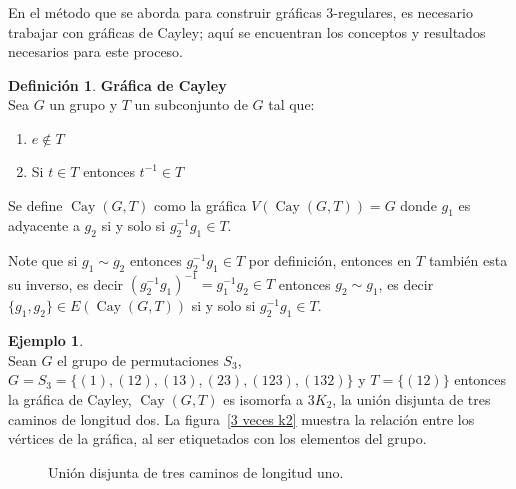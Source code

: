 \documentclass[11pt]{book}
\theoremstyle{definition}
\newtheorem{definition}{Definición}
\newtheorem{example}{Ejemplo}
\DeclareMathOperator{\Cay}{Cay}
\begin{document}
En el método que se aborda para construir gráficas 3-regulares, es
necesario trabajar con gráficas de Cayley; aquí se encuentran los
conceptos y resultados necesarios para este proceso.


\begin{definition}\textbf{Gráfica de Cayley}\\
  Sea $G$ un grupo y $T$ un subconjunto de $G$ tal que:
  \begin{enumerate}
  \item $e \notin T $
  \item Si $t\in T$ entonces $t^{-1}\in T$
  \end{enumerate}
  Se define $\Cay(G,T)$ como la gráfica $V(\Cay(G,T))=G$ donde $g_1$
  es adyacente a $g_2$ si y solo si $g_2^{-1}g_1 \in T$.\label{defcay}
\end{definition}

Note que si $g_1 \sim g_2$ entonces $g_2^{-1}g_1 \in T$ por
definición, entonces en $T$ también esta su inverso, es decir
$(g_2^{-1}g_1)^{-1} = g_1^{-1}g_2\in T$ entonces $g_2 \sim g_1$, es
decir $\{g_1,g_2\}\in E(\Cay(G,T))$ si y solo si
$g_2^{-1}g_1 \in T$.

\begin{example}\textbf{}\\
  Sean $G$ el grupo de permutaciones $S_3$, $G=S_3= \{(1),(12),(13),(23),(123),(132)\}$ y $T=\{(12)\}$
  entonces la gráfica de Cayley, $\Cay(G,T)$ es isomorfa a $3K_2$, la unión disjunta de tres caminos de longitud dos. La figura~\ref{3 veces k2} muestra la relación entre los vértices de la gráfica, al ser etiquetados con los elementos del grupo.
\end{example}

\begin{figure}[htb]
  \centering
  \caption{Unión disjunta de tres caminos de longitud uno.} \label{3
    veces k2}
\end{figure}
\end{document}
